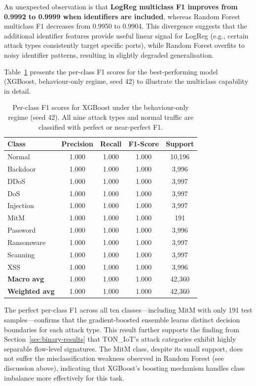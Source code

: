 \documentclass[12pt,a4paper]{report}
\begin{document}
An unexpected observation is that \textbf{LogReg multiclass F1 improves from 0.9992 to 0.9999 when identifiers are included}, whereas Random Forest multiclass F1 decreases from 0.9950 to 0.9904. This divergence suggests that the additional identifier features provide useful linear signal for LogReg (e.g., certain attack types consistently target specific ports), while Random Forest overfits to noisy identifier patterns, resulting in slightly degraded generalisation.

Table~\ref{tab:perclass-f1} presents the per-class F1 scores for the best-performing model (XGBoost, behaviour-only regime, seed 42) to illustrate the multiclass capability in detail.

\begin{table}[H]
\centering
\caption{Per-class F1 scores for XGBoost under the behaviour-only regime (seed 42). All nine attack types and normal traffic are classified with perfect or near-perfect F1.}
\label{tab:perclass-f1}
\begin{tabular}{lcccc}
\toprule
\textbf{Class} & \textbf{Precision} & \textbf{Recall} & \textbf{F1-Score} & \textbf{Support} \\
\midrule
Normal & 1.000 & 1.000 & 1.000 & 10,196 \\
Backdoor & 1.000 & 1.000 & 1.000 & 3,996 \\
DDoS & 1.000 & 1.000 & 1.000 & 3,997 \\
DoS & 1.000 & 1.000 & 1.000 & 3,997 \\
Injection & 1.000 & 1.000 & 1.000 & 3,997 \\
MitM & 1.000 & 1.000 & 1.000 & 191 \\
Password & 1.000 & 1.000 & 1.000 & 3,996 \\
Ransomware & 1.000 & 1.000 & 1.000 & 3,997 \\
Scanning & 1.000 & 1.000 & 1.000 & 3,997 \\
XSS & 1.000 & 1.000 & 1.000 & 3,996 \\
\midrule
\textbf{Macro avg} & 1.000 & 1.000 & 1.000 & 42,360 \\
\textbf{Weighted avg} & 1.000 & 1.000 & 1.000 & 42,360 \\
\bottomrule
\end{tabular}
\end{table}

The perfect per-class F1 across all ten classes---including MitM with only 191 test samples---confirms that the gradient-boosted ensemble learns distinct decision boundaries for each attack type. This result further supports the finding from Section~\ref{sec:binary-results} that TON\_IoT's attack categories exhibit highly separable flow-level signatures. The MitM class, despite its small support, does not suffer the misclassification weakness observed in Random Forest (see discussion above), indicating that XGBoost's boosting mechanism handles class imbalance more effectively for this task.
\end{document}
